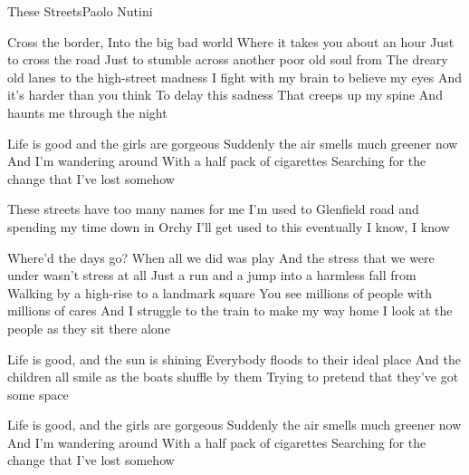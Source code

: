 \begin{Song}{These Streets}{Paolo Nutini}

\begin{multicols}{2}
\begin{Verse}
Cross the border,
Into the big bad world
Where it takes you about an hour
Just to cross the road
Just to stumble across another poor old soul from
The dreary old lanes to the high-street madness
I fight with my brain to believe my eyes
And it's harder than you think
To delay this sadness
That creeps up my spine
And haunts me through the night
\end{Verse}
\espaceInterStrophe

\begin{Bridge}
Life is good and the girls are gorgeous
Suddenly the air smells much greener now
And I'm wandering around
With a half pack of cigarettes
Searching for the change that I've lost somehow
\end{Bridge}
\espaceInterStrophe

\begin{Chorus}
These streets have too many names for me
I'm used to Glenfield road and spending my time down in Orchy
I'll get used to this eventually
I know, I know
\end{Chorus}
\espaceInterStrophe
\columnbreak

\begin{Verse}
Where'd the days go? When all we did was play
And the stress that we were under wasn't stress at all
Just a run and a jump into a harmless fall from
Walking by a high-rise to a landmark square
You see millions of people with millions of cares
And I struggle to the train to make my way home
I look at the people as they sit there alone
\end{Verse}
\espaceInterStrophe

\begin{Bridge}
Life is good, and the sun is shining
Everybody floods to their ideal place
And the children all smile as the boats shuffle by them
Trying to pretend that they've got some space
\end{Bridge}
\espaceInterStrophe

\tochorus[x2]
\espaceInterStrophe

\begin{Bridge}
Life is good, and the girls are gorgeous
Suddenly the air smells much greener now
And I'm wandering around
With a half pack of cigarettes
Searching for the change that I've lost somehow
\end{Bridge}
\espaceInterStrophe


\end{multicols}
\end{Song}
